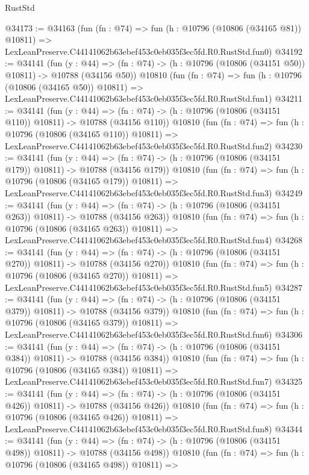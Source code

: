 \begin{lexlean}{RustStd}
\begin{coremodule}
@34173 := @34163
    (fun (fn : @74) =>
    fun (h : @10796 (@10806 (@34165 @81)) @10811) =>
    LexLeanPreserve.C44141062b63ebef453c0eb035f3ec5fd.R0.RustStd.fun0)
@34192 := @34141
    (fun (y : @44) =>
    (fn : @74) -> (h : @10796 (@10806 (@34151 @50)) @10811) -> @10788 (@34156 @50))
    @10810
    (fun (fn : @74) =>
    fun (h : @10796 (@10806 (@34165 @50)) @10811) =>
    LexLeanPreserve.C44141062b63ebef453c0eb035f3ec5fd.R0.RustStd.fun1)
@34211 := @34141
    (fun (y : @44) =>
    (fn : @74) -> (h : @10796 (@10806 (@34151 @110)) @10811) -> @10788 (@34156 @110))
    @10810
    (fun (fn : @74) =>
    fun (h : @10796 (@10806 (@34165 @110)) @10811) =>
    LexLeanPreserve.C44141062b63ebef453c0eb035f3ec5fd.R0.RustStd.fun2)
@34230 := @34141
    (fun (y : @44) =>
    (fn : @74) -> (h : @10796 (@10806 (@34151 @179)) @10811) -> @10788 (@34156 @179))
    @10810
    (fun (fn : @74) =>
    fun (h : @10796 (@10806 (@34165 @179)) @10811) =>
    LexLeanPreserve.C44141062b63ebef453c0eb035f3ec5fd.R0.RustStd.fun3)
@34249 := @34141
    (fun (y : @44) =>
    (fn : @74) -> (h : @10796 (@10806 (@34151 @263)) @10811) -> @10788 (@34156 @263))
    @10810
    (fun (fn : @74) =>
    fun (h : @10796 (@10806 (@34165 @263)) @10811) =>
    LexLeanPreserve.C44141062b63ebef453c0eb035f3ec5fd.R0.RustStd.fun4)
@34268 := @34141
    (fun (y : @44) =>
    (fn : @74) -> (h : @10796 (@10806 (@34151 @270)) @10811) -> @10788 (@34156 @270))
    @10810
    (fun (fn : @74) =>
    fun (h : @10796 (@10806 (@34165 @270)) @10811) =>
    LexLeanPreserve.C44141062b63ebef453c0eb035f3ec5fd.R0.RustStd.fun5)
@34287 := @34141
    (fun (y : @44) =>
    (fn : @74) -> (h : @10796 (@10806 (@34151 @379)) @10811) -> @10788 (@34156 @379))
    @10810
    (fun (fn : @74) =>
    fun (h : @10796 (@10806 (@34165 @379)) @10811) =>
    LexLeanPreserve.C44141062b63ebef453c0eb035f3ec5fd.R0.RustStd.fun6)
@34306 := @34141
    (fun (y : @44) =>
    (fn : @74) -> (h : @10796 (@10806 (@34151 @384)) @10811) -> @10788 (@34156 @384))
    @10810
    (fun (fn : @74) =>
    fun (h : @10796 (@10806 (@34165 @384)) @10811) =>
    LexLeanPreserve.C44141062b63ebef453c0eb035f3ec5fd.R0.RustStd.fun7)
@34325 := @34141
    (fun (y : @44) =>
    (fn : @74) -> (h : @10796 (@10806 (@34151 @426)) @10811) -> @10788 (@34156 @426))
    @10810
    (fun (fn : @74) =>
    fun (h : @10796 (@10806 (@34165 @426)) @10811) =>
    LexLeanPreserve.C44141062b63ebef453c0eb035f3ec5fd.R0.RustStd.fun8)
@34344 := @34141
    (fun (y : @44) =>
    (fn : @74) -> (h : @10796 (@10806 (@34151 @498)) @10811) -> @10788 (@34156 @498))
    @10810
    (fun (fn : @74) =>
    fun (h : @10796 (@10806 (@34165 @498)) @10811) =>

\end{coremodule}
\end{lexlean}
